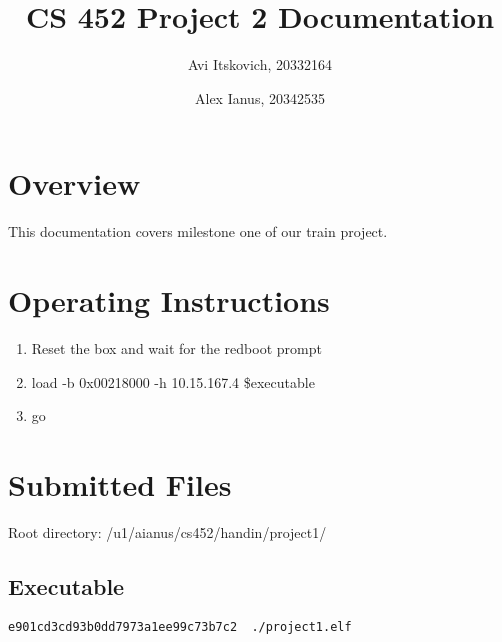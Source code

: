 \documentclass{article}
\title{CS 452 Project 2 Documentation}
\author{
  Avi Itskovich, 20332164
  \and
  Alex Ianus, 20342535
}
\begin{document}
\maketitle

\section{Overview}

This documentation covers milestone one of our train project.

\section{Operating Instructions}
\begin{enumerate}
  \item Reset the box and wait for the redboot prompt
  \item load -b 0x00218000 -h 10.15.167.4 \$executable
  \item go
\end{enumerate}

\section{Submitted Files}
Root directory: /u1/aianus/cs452/handin/project1/

\subsection{Executable}
\begin{verbatim}
e901cd3cd93b0dd7973a1ee99c73b7c2  ./project1.elf
\end{verbatim}
\end{document}
